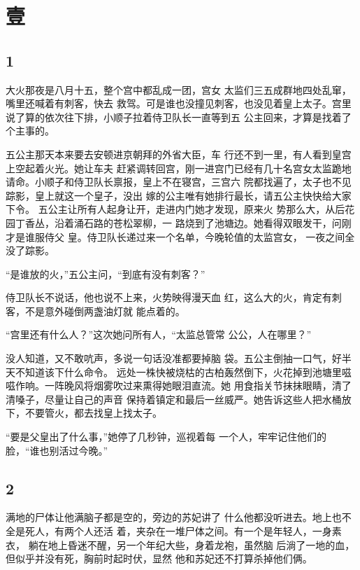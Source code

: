\section{壹}

{\centering\subsection{1}}

大火那夜是八月十五，整个宫中都乱成一团，宫女
太监们三五成群地四处乱窜，嘴里还喊着有刺客，快去
救驾。可是谁也没撞见刺客，也没见着皇上太子。宫里
说了算的依次往下排，小顺子拉着侍卫队长一直等到五
公主回来，才算是找着了个主事的。

五公主那天本来要去安顿进京朝拜的外省大臣，车
行还不到一里，有人看到皇宫上空起着火光。她让车夫
赶紧调转回宫，刚一进宫门已经有几十名宫女太监跪地
请命。小顺子和侍卫队长禀报，皇上不在寝宫，三宫六
院都找遍了，太子也不见踪影，皇上就这一个皇子，没出
嫁的公主唯有她排行最长，请五公主快快给大家下令。
五公主让所有人起身让开，走进内门她才发现，原来火
势那么大，从后花园丁香丛，沿着涌石路的苍松翠柳，一
路烧到了池塘边。她看得双眼发干，问刚才是谁服侍父
皇。侍卫队长递过来一个名单，今晚轮值的太监宫女，
一夜之间全没了踪影。

“是谁放的火，”五公主问，“到底有没有刺客？”

侍卫队长不说话，他也说不上来，火势映得漫天血
红，这么大的火，肯定有刺客，不是意外碰倒两盏油灯就
能点着的。

“宫里还有什么人？”这次她问所有人，“太监总管常
公公，人在哪里？”

没人知道，又不敢吭声，多说一句话没准都要掉脑
袋。五公主倒抽一口气，好半天不知道该下什么命令。
远处一株快被烧枯的古柏轰然倒下，火花掉到池塘里嗞
嗞作响。一阵晚风将烟雾吹过来熏得她眼泪直流。她
用食指关节抹抹眼睛，清了清嗓子，尽量让自己的声音
保持着镇定和最后一丝威严。她告诉这些人把水桶放
下，不要管火，都去找皇上找太子。

“要是父皇出了什么事，”她停了几秒钟，巡视着每
一个人，牢牢记住他们的脸，“谁也别活过今晚。”
\newline

{\centering\subsection{2}}

满地的尸体让他满脑子都是空的，旁边的苏妃讲了
什么他都没听进去。地上也不全是死人，有两个人还活
着，夹杂在一堆尸体之间。有一个是年轻人，一身素衣，
躺在地上昏迷不醒，另一个年纪大些，身着龙袍，虽然脑
后淌了一地的血，但似乎并没有死，胸前时起时伏，显然
他和苏妃还不打算杀掉他们俩。


